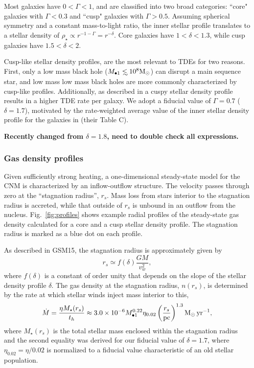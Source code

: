 \documentclass[usenatbib,fleqn]{mnras}
\newcommand\lsim{\mathrel{\rlap{\lower4pt\hbox{\hskip1pt$\sim$}}
    \raise1pt\hbox{$<$}}}
\newcommand{\Mbh}[1][]{M_{\bullet1}}
\newcommand{\Msun}{{\rm M_\odot}}
\newcommand{\rs}{r_s}
\begin{document}
Most galaxies have $0<\Gamma<1$, and are classified into two broad
categories: ``core" galaxies with $\Gamma<0.3$ and ``cusp" galaxies with
$\Gamma>0.5$. Assuming spherical symmetry and a constant mass-to-light
ratio, the inner stellar profile translates to a stellar density of
$\rho_\star\propto r^{-1-\Gamma}=r^{-\delta}$. Core galaxies have
$1<\delta<1.3$, while cusp galaxies have $1.5<\delta<2$.

Cusp-like stellar density profiles, are the most relevant to TDEs for
two reasons.  First, only a low mass black hole ($\Mbh\lsim 10^8
\Msun$) can disrupt a main sequence star, and low mass low mass black
holes are more commonly characterized by cusp-like profiles.
Additionally, as described in \citet{Stone&Metzger2016} a cuspy
stellar density profile results in a higher TDE rate per galaxy.  We
adopt a fiducial value of $\Gamma=0.7$ ($\delta=1.7$), motivated by
the rate-weighted average value of the inner stellar density profile for
the galaxies in \citet{Stone&Metzger2016} (their Table C).


 {\bf Recently changed from $\delta=1.8$, need to
  double check all expressions.}

\subsubsection{Gas density profiles}


Given sufficiently strong heating, a one-dimensional steady-state
model for the CNM is characterized by an inflow-outflow structure.
The velocity passes through zero at the ``stagnation radius'', $\rs$.
Mass loss from stars interior to the stagnation radius is accreted,
while that outside of $\rs$ is unbound in an outflow from the nucleus.
Fig.~\ref{fig:profiles} shows example radial profiles of the
steady-state gas density calculated for a core and a cusp stellar
density profile. The stagnation radius is marked as a blue dot on each
profile.

As described in GSM15, the stagnation radius is approximately given by
\begin{equation}
r_s \simeq f(\delta) \frac{G M}{v_w^2},
\label{eq:rs}
\end{equation}
%
where $f(\delta)$ is a constant of order unity that depends on the
slope of the stellar density profile $\delta$.  The gas density at the
stagnation radius, $n(\rs)$, is determined by the rate at which
stellar winds inject mass interior to this,
\begin{equation}
  \dot{M}=\frac{\eta M_{\rm \star}(\rs)}{t_h} \approx  3.0 \times 10^{-6} \Mbh[,7]^{0.22} \eta_{0.02} \left(\frac{r_s}{\rm
      pc}\right)^{1.3} \Msun \, {\rm yr}^{-1},
\label{eq:dotM}
\end{equation}
where $M_{\star}(\rs)$ is the total stellar mass enclosed within the
stagnation radius and the second equality was derived for our fiducial
value of $\delta=1.7$, where $\eta_{0.02}=\eta/0.02$ is normalized to
a fiducial value characteristic of an old stellar population.
\end{document}
